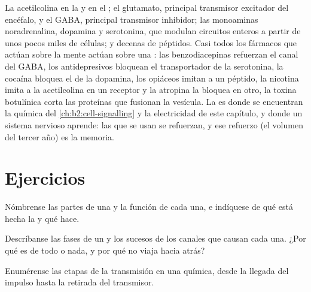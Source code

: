 \begin{example}\label{ex:b2:neurons-synapses:transmitters}
La acetilcolina en la  y en el ; el glutamato, principal transmisor excitador del encéfalo,
y el GABA, principal transmisor inhibidor; las monoaminas noradrenalina,
dopamina y serotonina, que modulan circuitos enteros a partir de unos
pocos miles de células; y decenas de péptidos. Casi todos los fármacos que
actúan sobre la mente actúan sobre una : las benzodiacepinas
refuerzan el canal del GABA, los antidepresivos bloquean el transportador
de la serotonina, la cocaína bloquea el de la dopamina, los opiáceos imitan
a un péptido, la nicotina imita a la acetilcolina en un receptor y la
atropina la bloquea en otro, la toxina botulínica corta las proteínas que
fusionan la vesícula. La  es donde se encuentran la química del
\cref{ch:b2:cell-signalling} y la electricidad de este capítulo, y donde
un sistema nervioso aprende: las  que se usan se refuerzan, y ese
refuerzo (el volumen del tercer año) es la memoria.
\end{example}

\section{Ejercicios}

\begin{exercise}[$\star$]\label{exo:b2:neurons-synapses:1}
Nómbrense las partes de una  y la función de cada una, e
indíquese de qué está hecha la  y qué hace.
\end{exercise}

\begin{exercise}[$\star$]\label{exo:b2:neurons-synapses:2}
Descríbanse las fases de un  y los sucesos de los
canales que causan cada una. ¿Por qué es de todo o nada, y por qué no
viaja hacia atrás?
\end{exercise}

\begin{exercise}[$\star$]\label{exo:b2:neurons-synapses:3}
Enumérense las etapas de la transmisión en una  química, desde la
llegada del impulso hasta la retirada del transmisor.
\end{exercise}


